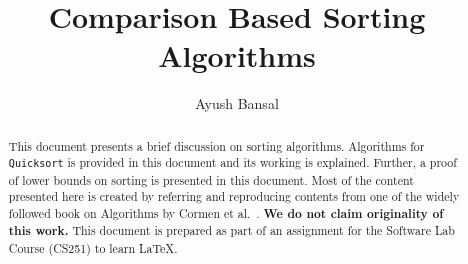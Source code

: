 \documentclass[10pt, twocolumn, a4paper]{article}
\title{Comparison Based Sorting Algorithms}
\author{Ayush Bansal}
\date{}
\let\bold\textbf
\let\cour\texttt
\begin{document}
\maketitle

\begin{abstract}
This document presents a brief discussion on sorting algorithms. Algorithms for \cour{Quicksort} is provided in this document and its working is explained. Further, a proof of lower bounds on sorting is presented in this document. Most of the content presented here is created by referring and reproducing contents from one of the widely followed book on Algorithms by Cormen et al.~\cite{cormen}. \bold{We do not claim originality of this work.} This document is prepared as part of an assignment for the Software Lab Course (CS251) to learn \LaTeX.

\end{abstract} 
\noindent {}
\end{document}
